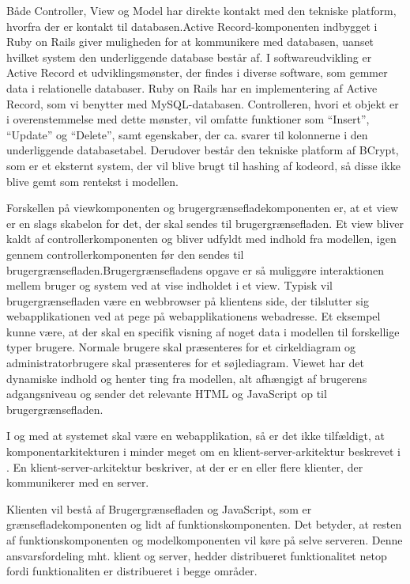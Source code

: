 Både Controller, View og Model har direkte kontakt med den tekniske platform, hvorfra der er kontakt til databasen.Active Record-komponenten indbygget i Ruby on Rails giver muligheden for at kommunikere med databasen, uanset hvilket system den underliggende database består af. I softwareudvikling er Active Record et udviklingsmønster, der findes i diverse software, som gemmer data i relationelle databaser. Ruby on Rails har en implementering af Active Record, som vi benytter med MySQL-databasen. Controlleren, hvori et objekt er i overenstemmelse med dette mønster, vil omfatte funktioner som ``Insert'', ``Update'' og ``Delete'', samt egenskaber, der ca. svarer til kolonnerne i den underliggende databasetabel.\cite{activerecordwiki} Derudover består den tekniske platform af BCrypt, som er et eksternt system, der vil blive brugt til hashing af kodeord, så disse ikke blive gemt som rentekst i modellen.

Forskellen på viewkomponenten og brugergrænsefladekomponenten er, at et view er en slags skabelon for det, der skal sendes til brugergrænsefladen. Et view bliver kaldt af controllerkomponenten og bliver udfyldt med indhold fra modellen, igen gennem controllerkomponenten før den sendes til brugergrænsefladen.Brugergrænsefladens opgave er så muliggøre interaktionen mellem bruger og system ved at vise indholdet i et view. Typisk vil brugergrænsefladen være en webbrowser på klientens side, der tilslutter sig webapplikationen ved at pege på webapplikationens webadresse. Et eksempel kunne være, at der skal en specifik visning af noget data i modellen til forskellige typer brugere. Normale brugere skal præsenteres for et cirkeldiagram og administratorbrugere skal præsenteres for et søjlediagram. Viewet har det dynamiske indhold og henter ting fra modellen, alt afhængigt af brugerens adgangsniveau og sender det relevante HTML og JavaScript op til brugergrænsefladen. 

I og med at systemet skal være en webapplikation, så er det ikke tilfældigt, at komponentarkitekturen i  minder meget om en klient-server-arkitektur beskrevet i . En klient-server-arkitektur beskriver, at der er en eller flere klienter, der kommunikerer med en server. 

Klienten vil bestå af Brugergrænsefladen og JavaScript, som er grænsefladekomponenten og lidt af funktionskomponenten. Det betyder, at resten af funktionskomponenten og modelkomponenten vil køre på selve serveren. Denne ansvarsfordeling mht. klient og server, hedder distribueret funktionalitet netop fordi funktionaliten er distribueret i begge områder.
